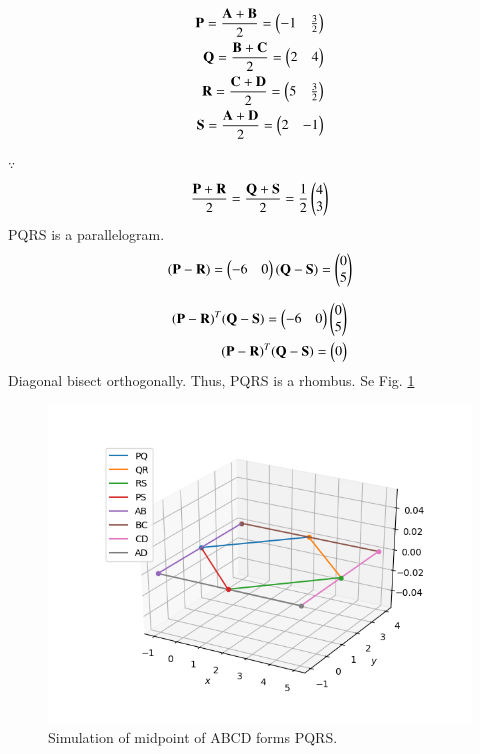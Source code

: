 \begin{align}
\mathbf{P}=\frac{\mathbf{A+B}}{2}=\begin{pmatrix}-1 & \frac{3}{2}\end{pmatrix}  \label{eqn}\\ 
\mathbf{Q}=\frac{\mathbf{B+C}}{2}=\begin{pmatrix}2 &4 \end{pmatrix}  \label{eqn}\\ 
\mathbf{R}=\frac{\mathbf{C+D}}{2}=\begin{pmatrix}5 & \frac{3}{2}\end{pmatrix}  \label{eqn}\\ 
\mathbf{S}=\frac{\mathbf{A+D}}{2}=\begin{pmatrix}2 & -1\end{pmatrix}  \label{eqn} 
\end{align}

$\because$
\begin{align}
\frac{\mathbf{P+R}}{2} = \frac{\mathbf{Q+S}}{2}=\frac{1}{2}\begin{pmatrix}4 \\ 3\end{pmatrix} \label{eqn}
\end{align} 
PQRS is a parallelogram.
\begin{align}
(\mathbf{P-R})=\begin{pmatrix}-6 & 0\end{pmatrix} 
(\mathbf{Q-S})=\begin{pmatrix}0\\5\end{pmatrix} \label{eqn}\\
\end{align}

\begin{align}
(\mathbf{P-R})^T(\mathbf{Q-S}) = \begin{pmatrix}-6 & 0\end{pmatrix}
\begin{pmatrix} 0 \\ 5 \end{pmatrix} \label{eqn}\\
(\mathbf{P-R})^T(\mathbf{Q-S})=\begin{pmatrix}0\end{pmatrix}\\  \label{eqn}
\end{align}
Diagonal bisect orthogonally. 
Thus, PQRS is a rhombus.  Se Fig. \ref{fig:Simulation of midpoint of ABCD form PQRS}

\begin{figure}[htbp]
\centering \includegraphics[width=\columnwidth]{./solutions/quad/1/Figure_1.png}
\caption{Simulation of midpoint of ABCD forms PQRS.}
\label{fig:Simulation of midpoint of ABCD form PQRS}
\end{figure}



